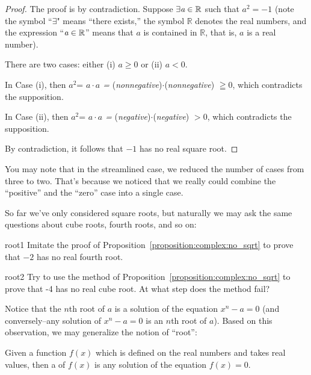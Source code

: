 \begin{proof}
The proof is by contradiction. Suppose $\exists \emph{a} \in \mathbb{R}$
such that $a^{2}=-1$ (note the symbol ``$\exists$" means ``there exists,'' the symbol $\mathbb{R}$ denotes the real numbers, and the expression ``$\emph{a} \in \mathbb{R}$'' means that $a$ is contained in $\mathbb{R}$, that is, $a$ is a real number).

There are two cases: either (i) $a\geq0$ or (ii) $a<0$.

In Case (i), then $a^{2}$= \emph{$a\cdot a$ =} (\emph{nonnegative})$\cdot$(\emph{nonnegative})
$\geqq0$, which contradicts the supposition.

In Case (ii), then $a^{2}$= \emph{$a\cdot a$ =} (\emph{negative})$\cdot$(\emph{negative})
$>0$, which contradicts the supposition.

By contradiction, it follows that $-1$ has no real square root.
\end{proof}
You may note that in the streamlined case, we reduced the number of cases from three to two.  That's because we noticed that we really could combine the ``positive'' and the ``zero'' case into a single case.

So far we've only considered square roots, but naturally we may ask the same questions about cube roots, fourth roots, and so on: 

\begin{exercise}{root1}
 Imitate the proof of Proposition~\ref{proposition:complex:no_sqrt} to prove that $-2$ has no real fourth root.
\end{exercise}

\begin{exercise}{root2}
Try to use the method of Proposition~\ref{proposition:complex:no_sqrt} to prove that -4 has no real cube root. At what step does the method fail?
\end{exercise}

Notice that the $n$th root of $a$ is a solution of the equation $x^n - a=0$ (and conversely--any solution of $x^n- a=0$ is an $n$th root of $a$). 
Based on this observation, we may generalize the notion of ``root'':

\begin{defn} Given a function $f(x)$ which is defined on the real numbers and takes real values, then a  of $f(x)$ is any solution of the equation $f(x)=0$.  
\end{defn}

